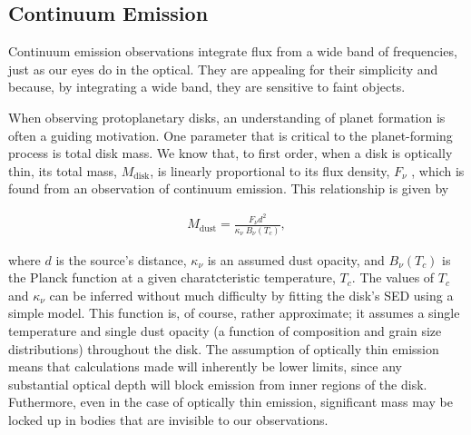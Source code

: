 \subsection{Continuum Emission}
\label{section:continuum_emission}

%


Continuum emission observations integrate flux from a wide band of frequencies, just as our eyes do in the optical. They are appealing for their simplicity and because, by integrating a wide band, they are sensitive to faint objects.

When observing protoplanetary disks, an understanding of planet formation is often a guiding motivation. One parameter that is critical to the planet-forming process is total disk mass. We know that, to first order, when a disk is optically thin, its total mass, $M_{\text{disk}}$, is linearly proportional to its flux density, $F_{\nu}$ \citep{Hildebrand1983}, which is found from an observation of continuum emission. This relationship is given by

\begin{align}
M_{\text{dust}} = \frac{F_{\nu} d^2}{\kappa_{\nu}\ B_{\nu}(T_c)},
\end{align}

where $d$ is the source's distance, $\kappa_{\nu}$ is an assumed dust opacity, and $B_{\nu}(T_c)$ is the Planck function at a given charatcteristic temperature, $T_c$. The values of $T_c$ and $\kappa_{\nu}$ can be inferred without much difficulty by fitting the disk's SED using a simple model. This function is, of course, rather approximate; it assumes a single temperature and single dust opacity (a function of composition and grain size distributions) throughout the disk. The assumption of optically thin emission means that calculations made will inherently be lower limits, since any substantial optical depth will block emission from inner regions of the disk. Futhermore, even in the case of optically thin emission, significant mass may be locked up in bodies that are invisible to our observations.


